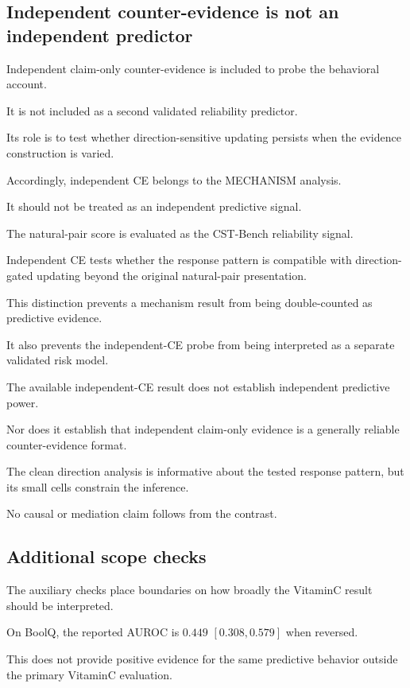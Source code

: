 \documentclass[11pt]{article}
\begin{document}
\subsection{Independent counter-evidence is not an independent predictor}

Independent claim-only counter-evidence is included to probe the behavioral account.

It is not included as a second validated reliability predictor.

Its role is to test whether direction-sensitive updating persists when the evidence construction is varied.

Accordingly, independent CE belongs to the MECHANISM analysis.

It should not be treated as an independent predictive signal.

The natural-pair score is evaluated as the CST-Bench reliability signal.

Independent CE tests whether the response pattern is compatible with direction-gated updating beyond the original natural-pair presentation.

This distinction prevents a mechanism result from being double-counted as predictive evidence.

It also prevents the independent-CE probe from being interpreted as a separate validated risk model.

The available independent-CE result does not establish independent predictive power.

Nor does it establish that independent claim-only evidence is a generally reliable counter-evidence format.

The clean direction analysis is informative about the tested response pattern, but its small cells constrain the inference.

No causal or mediation claim follows from the contrast.

\subsection{Additional scope checks}

The auxiliary checks place boundaries on how broadly the VitaminC result should be interpreted.

On BoolQ, the reported AUROC is \(0.449\) \([0.308,0.579]\) when reversed.

This does not provide positive evidence for the same predictive behavior outside the primary VitaminC evaluation.
\end{document}
